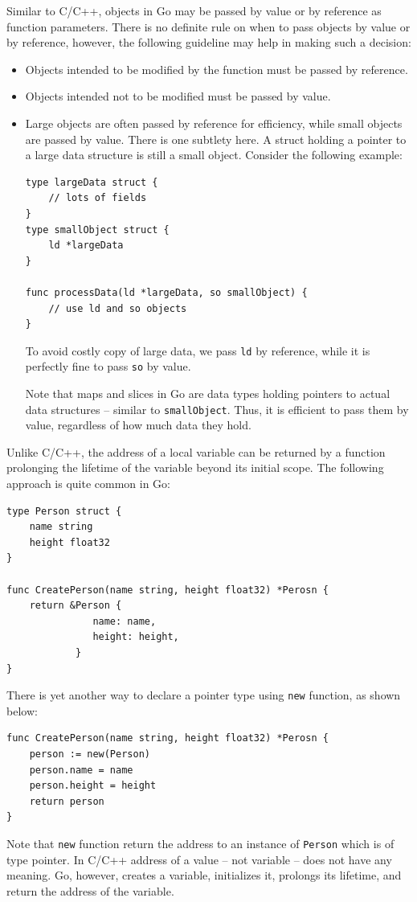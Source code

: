 \documentclass[11pt]{article}
\begin{document}
Similar to C/C++, objects in Go may be passed by value or by reference as function parameters. There is no definite rule on when to pass objects by value or by reference, however, the following guideline may help in making such a decision:
\begin{itemize}
\item Objects intended to be modified by the function must be passed by reference.
\item Objects intended not to be modified must be passed by value.
\item Large objects are often passed by reference for efficiency, while small objects are passed by value. There is one subtlety here. A struct holding a pointer to a large data structure is still a small object. Consider the following example:
\begin{verbatim}
type largeData struct {
	// lots of fields
}
type smallObject struct {
	ld *largeData
}

func processData(ld *largeData, so smallObject) {
	// use ld and so objects
}
\end{verbatim}
To avoid costly copy of large data, we pass \texttt{ld} by reference, while it is perfectly fine to pass \texttt{so} by value.

Note that maps and slices in Go are data types holding pointers to actual data structures -- similar to \texttt{smallObject}. Thus, it is efficient to pass them by value, regardless of how much data they hold.
\end{itemize}

Unlike C/C++, the address of a local variable can be returned by a function prolonging the lifetime of the variable beyond its initial scope. The following approach is quite common in Go:
\begin{verbatim}
type Person struct {
	name string
	height float32
}

func CreatePerson(name string, height float32) *Perosn {
	return &Person {
			   name: name,
			   height: height,
			}
}
\end{verbatim}
There is yet another way to declare a pointer type using \texttt{new} function, as shown below:
\begin{verbatim}
func CreatePerson(name string, height float32) *Perosn {
	person := new(Person)
	person.name = name
	person.height = height
	return person
}
\end{verbatim}
Note that \texttt{new} function return the address to an instance of \texttt{Person} which is of type pointer. In C/C++ address of a value -- not variable -- does not have any meaning. Go, however, creates a variable, initializes it, prolongs its lifetime, and return the address of the variable.
\end{document}
